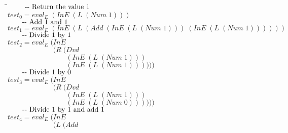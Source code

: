 \documentclass[10pt]{article}
\newlength{\lwidth}\setlength{\lwidth}{4.5cm}
\newlength{\cwidth}\setlength{\cwidth}{8mm} %
\newcommand{\Conid}[1]{\mathit{#1}}
\newcommand{\Varid}[1]{\mathit{#1}}
\begin{document}
\begin{tabbing}
\qquad\=\hspace{\lwidth}\=\hspace{\cwidth}\=\+\kill
${\mbox{\qquad-{}-  Return the value 1}}$\\
${\Varid{test}_0\mathrel{=}\Varid{eval}_E\;(\Conid{InE}\;(\Conid{L}\;(\Conid{Num}\;\mathrm{1})))}$\\
${}$\\
${\mbox{\qquad-{}-  Add 1 and 1}}$\\
${\Varid{test}_1\mathrel{=}\Varid{eval}_E\;(\Conid{InE}\;(\Conid{L}\;(\Conid{Add}\;(\Conid{InE}\;(\Conid{L}\;(\Conid{Num}\;\mathrm{1})))\;(\Conid{InE}\;(\Conid{L}\;(\Conid{Num}\;\mathrm{1}))))))}$\\
${}$\\
${\mbox{\qquad-{}-  Divide 1 by 1}}$\\
${\Varid{test}_2\mathrel{=}\Varid{eval}_E\;(\Conid{InE}}$\\
${\phantom{\Varid{test}_2\mathrel{=}\Varid{eval}_E\;(\mbox{}}(\Conid{R}\;(\Conid{Dvd}}$\\
${\phantom{\Varid{test}_2\mathrel{=}\Varid{eval}_E\;(\mbox{}}\phantom{(\Conid{R}\;(\mbox{}}(\Conid{InE}\;(\Conid{L}\;(\Conid{Num}\;\mathrm{1})))}$\\
${\phantom{\Varid{test}_2\mathrel{=}\Varid{eval}_E\;(\mbox{}}\phantom{(\Conid{R}\;(\mbox{}}(\Conid{InE}\;(\Conid{L}\;(\Conid{Num}\;\mathrm{1}))))))}$\\
${}$\\
${\mbox{\qquad-{}-  Divide 1 by 0}}$\\
${\Varid{test}_3\mathrel{=}\Varid{eval}_E\;(\Conid{InE}}$\\
${\phantom{\Varid{test}_3\mathrel{=}\Varid{eval}_E\;(\mbox{}}(\Conid{R}\;(\Conid{Dvd}}$\\
${\phantom{\Varid{test}_3\mathrel{=}\Varid{eval}_E\;(\mbox{}}\phantom{(\Conid{R}\;(\mbox{}}(\Conid{InE}\;(\Conid{L}\;(\Conid{Num}\;\mathrm{1})))}$\\
${\phantom{\Varid{test}_3\mathrel{=}\Varid{eval}_E\;(\mbox{}}\phantom{(\Conid{R}\;(\mbox{}}(\Conid{InE}\;(\Conid{L}\;(\Conid{Num}\;\mathrm{0}))))))}$\\
${}$\\
${\mbox{\qquad-{}-  Divide 1 by 1 and add 1}}$\\
${\Varid{test}_4\mathrel{=}\Varid{eval}_E\;(\Conid{InE}}$\\
${\phantom{\Varid{test}_4\mathrel{=}\Varid{eval}_E\;(\mbox{}}(\Conid{L}\;(\Conid{Add}}$\\

\end{tabbing}
\end{document}
